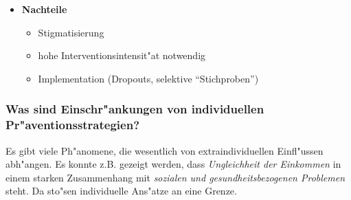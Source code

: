 \begin{itemize}
\begin{itemize}
                        \item \textbf{Nachteile}
                                \begin{itemize}
                                        \item Stigmatisierung
                                        \item hohe Interventionsintensit"at notwendig
                                        \item Implementation (Dropouts, selektive ``Stichproben'')
                                \end{itemize}
                \end{itemize}
\end{itemize}

\subsubsection{Was sind Einschr"ankungen von individuellen Pr"aventionsstrategien?}
Es gibt viele Ph"anomene, die wesentlich von extraindividuellen Einfl"ussen abh"angen. Es konnte z.B. gezeigt werden, dass \emph{Ungleichheit der Einkommen} in einem starken Zusammenhang mit \emph{sozialen und gesundheitsbezogenen Problemen} steht. Da sto"sen individuelle Ans"atze an eine Grenze.
